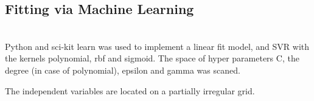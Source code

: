 %


\subsection{Fitting via Machine Learning}
\\
Python and sci-kit learn  was used to implement a linear fit model, and SVR with the kernels polynomial, rbf and sigmoid. 
The space of hyper parameters C, the degree (in case of polynomial), epsilon and gamma was scaned. 

The independent variables are located on a partially irregular grid.  

